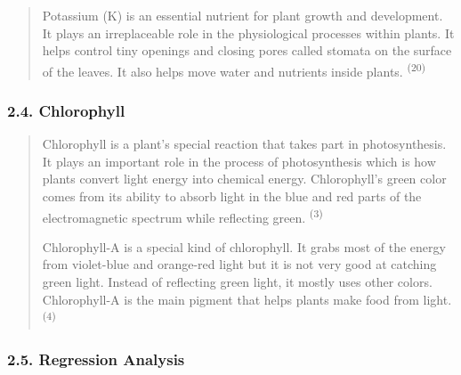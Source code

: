 \documentclass[
]{article}
\begin{document}
\begin{quote}
Potassium (K) is an essential nutrient for plant growth and development.
It plays an irreplaceable role in the physiological processes within
plants. It helps control tiny openings and closing pores called stomata
on the surface of the leaves. It also helps move water and nutrients
inside plants. \textsuperscript{(20)}
\end{quote}

\hypertarget{chlorophyll}{%
\subsubsection{\texorpdfstring{\textbf{2.4. Chlorophyll}
}{2.4. Chlorophyll }}\label{chlorophyll}}

\begin{quote}
Chlorophyll is a plant's special reaction that takes part in
photosynthesis. It plays an important role in the process of
photosynthesis which is how plants convert light energy into chemical
energy. Chlorophyll's green color comes from its ability to absorb light
in the blue and red parts of the electromagnetic spectrum while
reflecting green. \textsuperscript{(3)}

Chlorophyll-A is a special kind of chlorophyll. It grabs most of the
energy from violet-blue and orange-red light but it is not very good at
catching green light. Instead of reflecting green light, it mostly uses
other colors. Chlorophyll-A is the main pigment that helps plants make
food from light. \textsuperscript{(4)}
\end{quote}

\hypertarget{regression-analysis}{%
\subsubsection{\texorpdfstring{ \textbf{2.5. Regression
Analysis}}{ 2.5. Regression Analysis}}\label{regression-analysis}}
\end{document}
